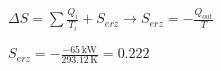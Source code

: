 \( \Delta S = \sum \frac{Q_i}{T_i} + S_{erz} \rightarrow S_{erz} = -\frac{Q_{out}}{T} \)  

\( S_{erz} = -\frac{-65 \, \text{kW}}{293.12 \, \text{K}} = 0.222 \)